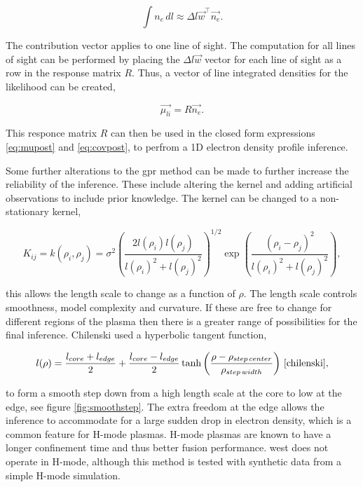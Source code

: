 \begin{equation}
  \int n_e \, dl \approx \Delta l \vec{w}^{\top} \vec{n_e}.
\end{equation}

\noindent The contribution vector applies to one line of sight. The computation for all lines of sight can be performed by placing the $\Delta l \vec{w}$ vector for each line of sight as a row in the response matrix $R$. Thus, a vector of line integrated densities for the likelihood can be created,

\begin{equation}
  \vec{\mu_{li}} = R \vec{n_e}.
\end{equation}

\noindent This responce matrix $R$ can then be used in the closed form expressions \ref{eq:mupost} and \ref{eq:covpost}, to perfrom a 1D electron density profile inference.

Some further alterations to the \gls{gpr} method can be made to further increase the reliability of the inference. These include altering the kernel and adding artificial observations to include prior knowledge. The kernel can be changed to a non-stationary kernel, 

\begin{equation}
  K_{ij} = k(\rho_i, \rho_j) = \sigma^2 \left( \frac{2l(\rho_i)l(\rho_j)}{l(\rho_i)^2 + l(\rho_j)^2} \right)^{1/2} \exp\left({\frac{(\rho_i - \rho_j)^2}{l(\rho_i)^2+l(\rho_j)^2}}\right),
\end{equation}

\noindent this allows the length scale to change as a function of $\rho$. The length scale controls smoothness, model complexity and curvature. If these are free to change for different regions of the plasma then there is a greater range of possibilities for the final inference. Chilenski used a hyperbolic tangent function,

\begin{equation}
  l(\rho) = \frac{l_{core} + l_{edge}}{2} + \frac{l_{core} - l_{edge}}{2} \tanh\left(\frac{\rho-\rho_{step\,center}}{\rho_{step\,width}}\right) \, \cite{chilenski}, 
  \label{eq:smoothstep}
\end{equation}

\noindent to form a smooth step down from a high length scale at the core to low at the edge, see figure \ref{fig:smoothstep}. The extra freedom at the edge allows the inference to accommodate for a large sudden drop in electron density, which is a common feature for H-mode plasmas. H-mode plasmas are known to have a longer confinement time and thus better fusion performance. \gls{west} does not operate in H-mode, although this method is tested with synthetic data from a simple H-mode simulation.

